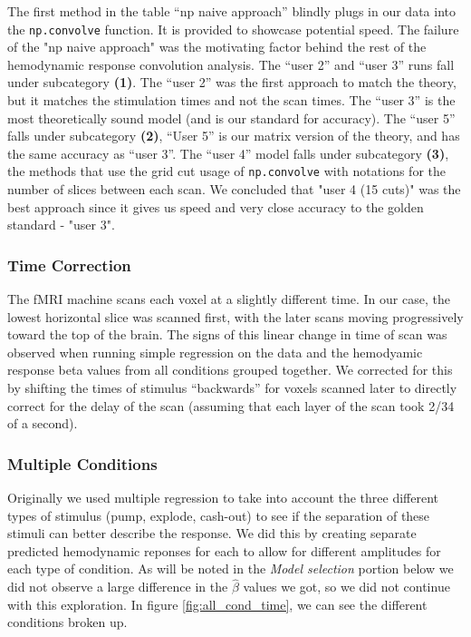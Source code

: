 \par \noindent The first method in the table ``np naive approach'' blindly 
plugs in our data into the \texttt{np.convolve} function. It is provided to 
showcase potential speed. The failure of the "np naive approach" was the 
motivating factor behind the rest of the hemodynamic response convolution 
analysis. The ``user 2'' and ``user 3'' runs fall under subcategory 
\textbf{(1)}. The ``user 2'' was the first approach to
match the theory, but it matches the stimulation times and not the scan times.
The ``user 3'' is the most theoretically sound model (and is our standard for 
accuracy). The ``user 5'' falls under subcategory \textbf{(2)}, ``User 5''  is
our matrix version of the theory, and has the same accuracy as ``user 3''. The 
``user 4'' model falls under subcategory \textbf{(3)}, the methods that use the
grid cut usage of \texttt{np.convolve} with notations for the number of slices 
between each scan. We concluded that "user 4 (15 cuts)" was the best approach 
since it gives us speed and very close accuracy to the golden standard - "user 
3".

\subsubsection{Time Correction}

\par \indent The fMRI machine scans each voxel at a slightly different time. 
In our case, the lowest horizontal slice was scanned first, with the later 
scans moving progressively toward the top of the brain. The signs of this 
linear change in time of scan was observed when running simple regression on 
the data and the hemodyamic response beta values from all conditions grouped 
together. We corrected for this  by shifting the times of stimulus 
``backwards'' for voxels scanned later to directly correct for the delay of 
the scan (assuming that each layer of the scan took 2/34 of a second).

\subsubsection{Multiple Conditions}

\par \indent Originally we used multiple regression to take into account the 
three different types of stimulus (pump, explode, cash-out) to see if the 
separation of these stimuli can better describe the response. We did this by 
creating separate predicted hemodynamic reponses for each to allow for 
different amplitudes for each type of condition. As will be noted in the 
\textit{Model selection} portion below we did not observe a large difference in
the $\hat{\beta}$ values we got, so we did not continue with this exploration. 
In figure \ref{fig:all_cond_time}, we can see the different conditions broken 
up.


